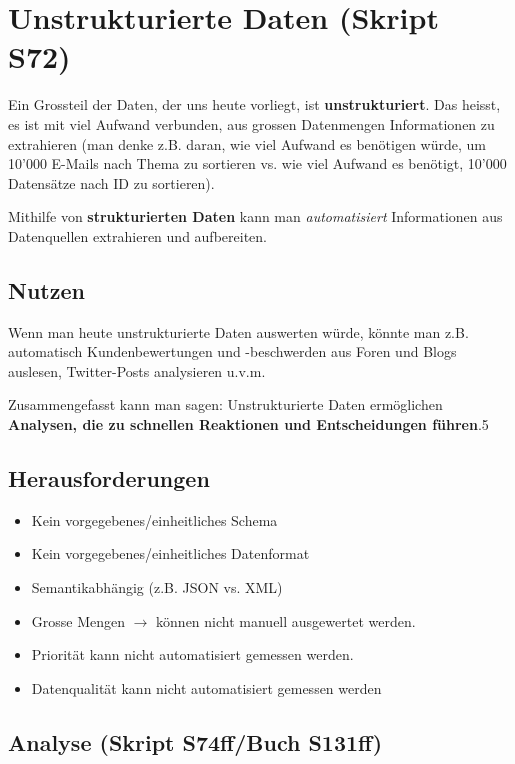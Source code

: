 \documentclass[a4paper, 11pt, nofootinbib]{article}
\begin{document}
\newpage

\section{Unstrukturierte Daten (Skript S72)}
Ein Grossteil der Daten, der uns heute vorliegt, ist \textbf{unstrukturiert}. Das heisst, es ist mit viel Aufwand verbunden, aus grossen Datenmengen Informationen zu extrahieren (man denke z.B. daran, wie viel Aufwand es benötigen würde, um 10'000 E-Mails nach Thema zu sortieren vs. wie viel Aufwand es benötigt, 10'000 Datensätze nach ID zu sortieren).

Mithilfe von \textbf{strukturierten Daten} kann man \textit{automatisiert} Informationen aus Datenquellen extrahieren und aufbereiten.

\subsection{Nutzen}

\noindent Wenn man heute unstrukturierte Daten auswerten würde, könnte man z.B. automatisch Kundenbewertungen und -beschwerden aus Foren und Blogs auslesen, Twitter-Posts analysieren u.v.m. 

Zusammengefasst kann man sagen: Unstrukturierte Daten ermöglichen \textbf{Analysen, die zu schnellen Reaktionen und Entscheidungen führen}.5

\subsection{Herausforderungen}

\begin{itemize}
	\item Kein vorgegebenes/einheitliches Schema
	\item Kein vorgegebenes/einheitliches Datenformat
	\item Semantikabhängig (z.B. JSON vs. XML)
	\item Grosse Mengen $\rightarrow$ können nicht manuell ausgewertet werden.
	\item Priorität kann nicht automatisiert gemessen werden.
	\item Datenqualität kann nicht automatisiert gemessen werden
\end{itemize}

\subsection{Analyse (Skript S74ff/Buch S131ff)}
\end{document}
